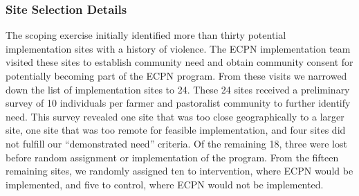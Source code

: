 \documentclass[
]{article}
\begin{document}
\hypertarget{site-selection-details}{%
\subsubsection{Site Selection Details}\label{site-selection-details}}

The scoping exercise initially identified more than thirty potential
implementation sites with a history of violence. The ECPN implementation
team visited these sites to establish community need and obtain
community consent for potentially becoming part of the ECPN program.
From these visits we narrowed down the list of implementation sites to
24. These 24 sites received a preliminary survey of 10 individuals per
farmer and pastoralist community to further identify need. This survey
revealed one site that was too close geographically to a larger site,
one site that was too remote for feasible implementation, and four sites
did not fulfill our ``demonstrated need'' criteria. Of the remaining 18,
three were lost before random assignment or implementation of the
program. From the fifteen remaining sites, we randomly assigned ten to
intervention, where ECPN would be implemented, and five to control,
where ECPN would not be implemented.
\end{document}

